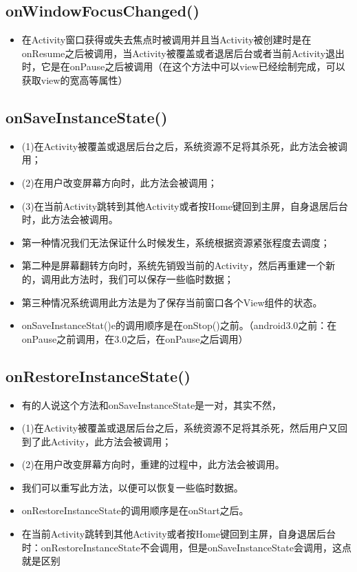\documentclass[9pt, b5paaper]{book}
\begin{document}
\subsection{onWindowFocusChanged()}
\label{sec-1-3-1}
\begin{itemize}
\item 在Activity窗口获得或失去焦点时被调用并且当Activity被创建时是在onResume之后被调用，当Activity被覆盖或者退居后台或者当前Activity退出时，它是在onPause之后被调用（在这个方法中可以view已经绘制完成，可以获取view的宽高等属性）
\end{itemize}
\subsection{onSaveInstanceState()}
\label{sec-1-3-2}
\begin{itemize}
\item (1)在Activity被覆盖或退居后台之后，系统资源不足将其杀死，此方法会被调用；
\item (2)在用户改变屏幕方向时，此方法会被调用；
\item (3)在当前Activity跳转到其他Activity或者按Home键回到主屏，自身退居后台时，此方法会被调用。
\item 第一种情况我们无法保证什么时候发生，系统根据资源紧张程度去调度；
\item 第二种是屏幕翻转方向时，系统先销毁当前的Activity，然后再重建一个新的，调用此方法时，我们可以保存一些临时数据；
\item 第三种情况系统调用此方法是为了保存当前窗口各个View组件的状态。
\item onSaveInstanceStat()e的调用顺序是在onStop()之前。（android3.0之前：在onPause之前调用，在3.0之后，在onPause之后调用）
\end{itemize}
\subsection{onRestoreInstanceState()}
\label{sec-1-3-3}
\begin{itemize}
\item 有的人说这个方法和onSaveInstanceState是一对，其实不然，
\item (1)在Activity被覆盖或退居后台之后，系统资源不足将其杀死，然后用户又回到了此Activity，此方法会被调用；
\item (2)在用户改变屏幕方向时，重建的过程中，此方法会被调用。
\item 我们可以重写此方法，以便可以恢复一些临时数据。
\item onRestoreInstanceState的调用顺序是在onStart之后。
\item 在当前Activity跳转到其他Activity或者按Home键回到主屏，自身退居后台时：onRestoreInstanceState不会调用，但是onSaveInstanceState会调用，这点就是区别
\end{itemize}
\end{document}
